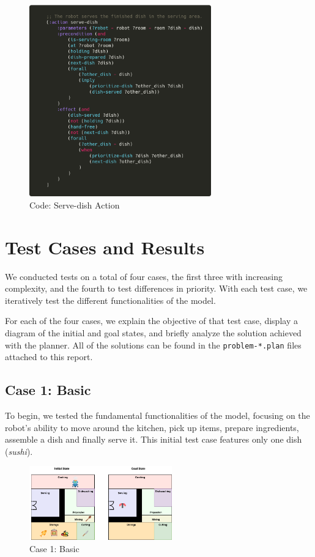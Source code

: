 \documentclass{article}
\begin{document}
    \begin{figure}[ht]
    \centering
    \includegraphics[width=0.70\textwidth]{assets/serve-dish.png}
    \caption{Code: Serve-dish Action}
    \label{fig:act:serve-dish}
\end{figure}

\newpage
\section{Test Cases and Results}

We conducted tests on a total of four cases, the first three with increasing complexity, and the fourth to test differences in priority. With each test case, we iteratively test the different functionalities of the model.

For each of the four cases, we explain the objective of that test case, display a diagram of the initial and goal states, and briefly analyze the solution achieved with the planner. All of the solutions can be found in the \texttt{problem-*.plan} files attached to this report.

\subsection{Case 1: Basic}

To begin, we tested the fundamental functionalities of the model, focusing on the robot's ability to move around the kitchen, pick up items, prepare ingredients, assemble a dish and finally serve it. This initial test case features only one dish (\textit{sushi}).

\begin{figure}[ht]
    \centering
    \includegraphics[width=0.55\textwidth]{illustrations/problem-1-initial.drawio.png}
    \caption{Case 1: Basic}
    \label{fig:initial-state}
\end{figure}
\FloatBarrier
\end{document}
